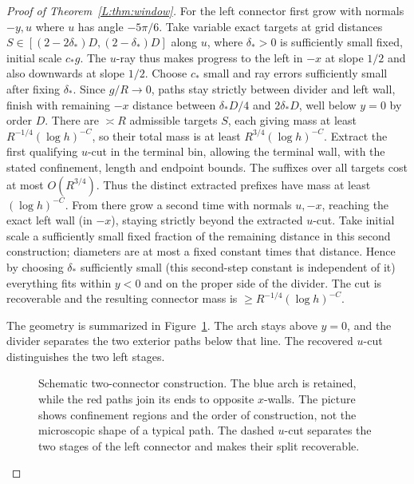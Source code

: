 \begin{proof}[Proof of Theorem~\ref{L:thm:window}]
For the left connector first grow with normals \(-y,u\) where \(u\) has angle \(-5\pi/6\). Take variable exact targets at grid distances \(S\in[(2-2\delta_*)D,(2-\delta_*)D]\) along \(u\), where \(\delta_*>0\) is sufficiently small fixed, initial scale \(c_* g\). The \(u\)-ray thus makes progress to the left in \(-x\) at slope \(1/2\) and also downwards at slope \(1/2\). Choose \(c_*\) small and ray errors sufficiently small after fixing \(\delta_*\). Since \(g/R\to0\), paths stay strictly between divider and left wall, finish with remaining \(-x\) distance between \(\delta_*D/4\) and \(2\delta_*D\), well below \(y=0\) by order \(D\). There are $\asymp R$ admissible targets $S$, each giving mass at least
$R^{-1/4}(\log h)^{-C}$, so their total mass is at least
$R^{3/4}(\log h)^{-C}$. Extract the first qualifying $u$-cut in the
terminal bin, allowing the terminal wall, with the stated confinement,
length and endpoint bounds. The suffixes over all targets cost at most
$O(R^{3/4})$. Thus the distinct extracted prefixes have mass at least
$(\log h)^{-C}$. From there grow a second time with normals \(u,-x\), reaching the exact left wall (in \(-x\)), staying strictly beyond the extracted \(u\)-cut. Take initial scale a sufficiently small fixed fraction of the remaining distance in this second construction; diameters are at most a fixed constant times that distance. Hence by choosing \(\delta_*\) sufficiently small (this second-step constant is independent of it) everything fits within \(y<0\) and on the proper side of the divider. The cut is recoverable and the resulting connector mass is \(\ge R^{-1/4}(\log h)^{-C}\).

The geometry is summarized in Figure~\ref{L:fig:connectors}. The arch
stays above $y=0$, and the divider separates the two exterior paths below
that line. The recovered $u$-cut distinguishes the two left stages.
\begin{figure}[htbp]
\centering
\caption{Schematic two-connector construction. The blue arch is retained,
while the red paths join its ends to opposite $x$-walls. The picture shows
confinement regions and the order of construction, not the microscopic
shape of a typical path. The dashed $u$-cut separates the two stages of the left connector
and makes their split recoverable.}\label{L:fig:connectors}
\end{figure}



\end{proof}
